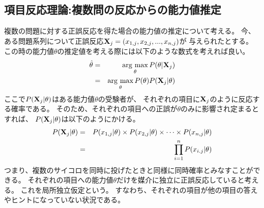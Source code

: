 \documentclass[12pt]{jarticle}
\begin{document}
\subsection{項目反応理論:複数問の反応からの能力値推定}
複数の問題に対する正誤反応を得た場合の能力値の推定について考える。
今、
ある問題系列について正誤反応${\bf X}_j=(x_{1,j},x_{2,j},...,x_{n,j})$が
与えられたとする。
この時の能力値$\theta$の推定値を考える際には以下のような数式を考えれば良い。
\begin{eqnarray}
    \hat{\theta}&=& \mathop{\rm arg~max}\limits_{\theta} P(\theta|{\bf X}_j)\\
    &=& \mathop{\rm arg~max}\limits_{\theta} P(\theta)P({\bf X}_j|\theta)
\end{eqnarray}
ここで$P({\bf X}_j|\theta)$はある能力値$\theta$の受験者が、
それぞれの項目に${\bf X}_j$のように反応する確率である。
そのため、それぞれの項目への正誤が$\theta$のみに影響され定まるとすれば、
$P({\bf X}_j|\theta)$は以下のようにかける。
\begin{eqnarray}
    P({\bf X}_j|\theta)&=&P(x_{1,j}|\theta)\times P(x_{2,j}|\theta)\times \cdots \times P(x_{n,j}|\theta)\\
    &=& \prod_{i=1}^n P(x_{i.j}|\theta)
\end{eqnarray}
つまり、複数のサイコロを同時に投げたときと同様に同時確率とみなすことができる。
それぞれの項目への能力値$\theta$だけを媒介に独立に正誤反応していると考える。
これを局所独立仮定という。
すなわち、それぞれの項目が他の項目の答えやヒントになっていない状況である。
\end{document}
